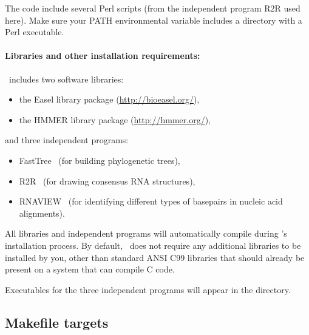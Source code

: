 The code include several Perl scripts (from the independent program
R2R used here). Make sure your PATH environmental variable includes a
directory with a Perl executable.

\paragraph{Libraries and other installation requirements:}

\rscape\ includes two software libraries:

\begin{itemize}
\item the Easel library package (\url{http://bioeasel.org/}),
\item the HMMER library package (\url{http://hmmer.org/}),
\end{itemize}

and three independent programs:

\begin{itemize}
\item FastTree~\citep{Price10} (for building phylogenetic trees),
  
\item R2R~\citep{WeinbergBreaker11} (for drawing consensus RNA
  structures),

\item RNAVIEW~\citep{YangWesthof03} (for identifying different types of
  basepairs in nucleic acid alignments).
  
\end{itemize}

 All libraries and independent programs will automatically compile
 during \rscape's installation process.  By default, \rscape\ does not
 require any additional libraries to be installed by you, other than
 standard ANSI C99 libraries that should already be present on a
 system that can compile C code.

 Executables for the three independent programs will appear in the
  directory.

\subsection{Makefile targets}

